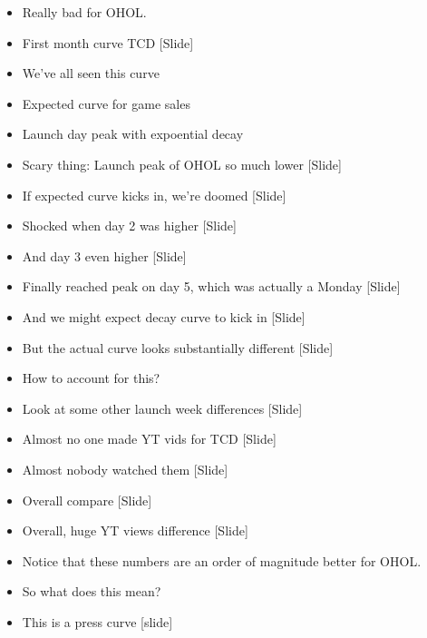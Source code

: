 \documentclass[12pt]{article}
\begin{document}
{\begin{itemize}
\item Really bad for OHOL.

\item First month curve TCD [Slide]

\item We've all seen this curve

\item Expected curve for game sales

\item Launch day peak with expoential decay

\item Scary thing:  Launch peak of OHOL so much lower [Slide]

\item If expected curve kicks in, we're doomed [Slide]

\item Shocked when day 2 was higher [Slide]

\item And day 3 even higher [Slide]

\item Finally reached peak on day 5, which was actually a Monday [Slide]

\item And we might expect decay curve to kick in [Slide]

\item But the actual curve looks substantially different [Slide]

\item How to account for this?

\item Look at some other launch week differences [Slide]

\item Almost no one made YT vids for TCD [Slide]

\item Almost nobody watched them [Slide]

\item Overall compare [Slide]

\item Overall, huge YT views difference [Slide]

\item Notice that these numbers are an order of magnitude better for OHOL.

\item So what does this mean?

\item This is a press curve [slide]


\end{itemize}}
\end{document}
